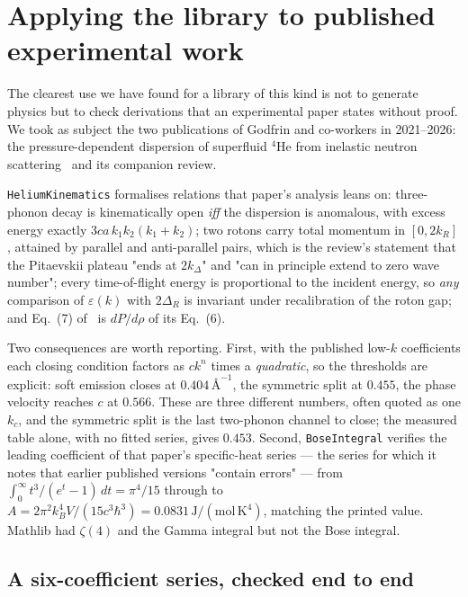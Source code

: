 \documentclass[11pt,a4paper]{article}
\theoremstyle{definition}
\newcommand{\lean}[1]{\texttt{\small #1}}
\begin{document}
\section{Applying the library to published experimental work}
\label{sec:godfrin}

The clearest use we have found for a library of this kind is not to generate physics but to check
derivations that an experimental paper states without proof. We took as subject the two publications
of Godfrin and co-workers in 2021--2026: the pressure-dependent dispersion of superfluid $^4$He from
inelastic neutron scattering~\cite{Godfrin2021} and its companion review.

\lean{HeliumKinematics} formalises relations that paper's analysis leans on: three-phonon decay is
kinematically open \emph{iff} the dispersion is anomalous, with excess energy exactly
$3ca\,k_1k_2(k_1+k_2)$; two rotons carry total momentum in $[0,2k_R]$, attained by parallel and
anti-parallel pairs, which is the review's statement that the Pitaevskii plateau "ends at $2k_\Delta$"
and "can in principle extend to zero wave number"; every time-of-flight energy is proportional to the
incident energy, so \emph{any} comparison of $\varepsilon(k)$ with $2\Delta_R$ is invariant under
recalibration of the roton gap; and Eq.~(7) of~\cite{Godfrin2021} is $dP/d\rho$ of its Eq.~(6).

Two consequences are worth reporting. First, with the published low-$k$ coefficients each closing
condition factors as $ck^n$ times a \emph{quadratic}, so the thresholds are explicit: soft emission
closes at $0.404\,\text{\AA}^{-1}$, the symmetric split at $0.455$, the phase velocity reaches $c$ at
$0.566$. These are three different numbers, often quoted as one $k_c$, and the symmetric split is the
last two-phonon channel to close; the measured table alone, with no fitted series, gives $0.453$.
Second, \lean{BoseIntegral} verifies the leading coefficient of that paper's specific-heat series ---
the series for which it notes that earlier published versions "contain errors" --- from
$\int_0^\infty t^3/(e^t-1)\,dt = \pi^4/15$ through to $A = 2\pi^2k_B^4V/(15c^3\hbar^3) =
0.0831\,\mathrm{J/(mol\,K^4)}$, matching the printed value. Mathlib had $\zeta(4)$ and the Gamma
integral but not the Bose integral.

\subsection{A six-coefficient series, checked end to end}
\label{sec:series}
\end{document}
